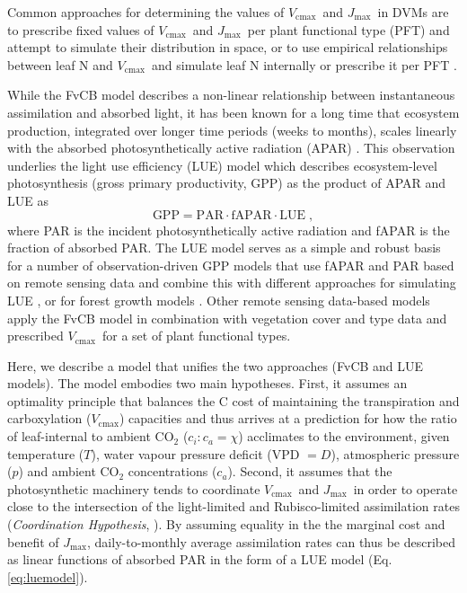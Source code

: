 \documentclass{myreport}
\newcommand{\vcmax}{$V_{\text{cmax}}$}
\newcommand{\jmax}{$J_{\text{max}}$}
\begin{document}
Common approaches for determining the values of \vcmax\ and \jmax\ in DVMs are to prescribe fixed values of \vcmax\ and \jmax\ per plant functional type (PFT) and attempt to simulate their distribution in space, or to use empirical relationships between leaf N and \vcmax\ and simulate leaf N internally or prescribe it per PFT \citep{smithdukes13gcb, rogers14}. 

While the FvCB model describes a non-linear relationship between instantaneous assimilation and absorbed light, it has been known for a long time that ecosystem production, integrated over longer time periods (weeks to months), scales linearly with the absorbed photosynthetically active radiation (APAR) \citep{monteith72, medlyn98}. This observation underlies the light use efficiency (LUE) model which describes ecosystem-level photosynthesis (gross primary productivity, GPP) as the product of APAR and LUE as
\begin{equation}
\label{eq:luemodel}
\text{GPP} = \text{PAR} \cdot \text{fAPAR} \cdot \text{LUE} \;,
\end{equation}
where PAR is the incident photosynthetically active radiation and fAPAR is the fraction of absorbed PAR. The LUE model serves as a simple and robust basis for a number of observation-driven GPP models that use fAPAR and PAR based on remote sensing data and combine this with different approaches for simulating LUE \citep{running04, Zhang2017-yr, field95rse}, or for forest growth models \citep{landsberg97fem}. Other remote sensing data-based models \citep{jiang16rse} apply the FvCB model in combination with vegetation cover and type data and prescribed \vcmax\ for a set of plant functional types.

Here, we describe a model that unifies the two approaches (FvCB and LUE models). The model embodies two main hypotheses. First, it assumes an optimality principle that balances the C cost of maintaining the transpiration and carboxylation (\vcmax ) capacities and thus arrives at a prediction for how the ratio of leaf-internal to ambient CO$_2$ ($c_i:c_a = \chi$) acclimates to the environment, given temperature ($T$), water vapour pressure deficit (VPD $= D$), atmospheric pressure ($p$) and ambient CO$_2$ concentrations ($c_a$). Second, it assumes that the photosynthetic machinery tends to coordinate \vcmax\ and \jmax\ in order to operate close to the intersection of the light-limited and Rubisco-limited assimilation rates (\textit{Coordination Hypothesis}, \cite{chen93, maire12po}). %
By assuming equality in the the marginal cost and benefit of \jmax , daily-to-monthly average assimilation rates can thus be described as linear functions of absorbed PAR in the form of a LUE model (Eq. \ref{eq:luemodel}).  
\end{document}
